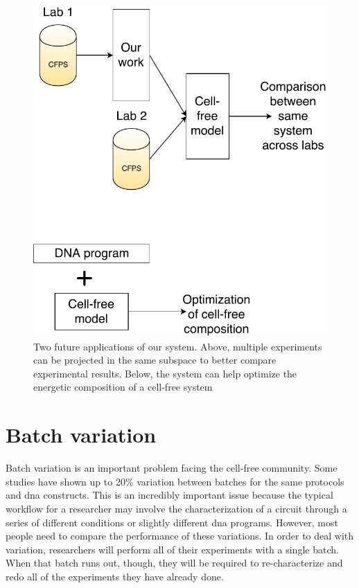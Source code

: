 \begin{figure}[t!]
\begin{center}
\includegraphics{figs/Applications.pdf}
\caption{Two future applications of our system.
Above, multiple experiments can be projected in the same subspace to better compare experimental results.
Below, the system can help optimize the energetic composition of a cell-free system}
\end{center}
\label{fig:apps}
\end{figure}

\section{Batch variation}
Batch variation is an important problem facing the cell-free community.
Some studies have shown up to 20\% variation between batches for the same protocols and \gls{dna} constructs.
This is an incredibly important issue because the typical workflow for a researcher may involve the characterization of a circuit through a series of different conditions or slightly different \gls{dna} programs.
However, most people need to compare the performance of these variations.
In order to deal with variation, researchers will perform all of their experiments with a single batch.
When that batch runs out, though, they will be required to re-characterize and redo all of the experiments they have already done.

